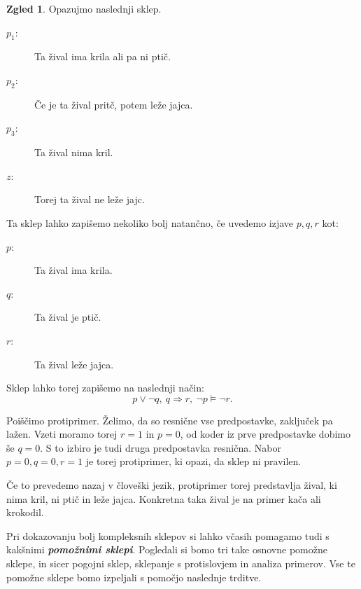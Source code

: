 \documentclass[11pt]{book}
\def\definicija{\color{rdeca}\bf\em}
\theoremstyle{definition}
\theoremstyle{zgled}
\newtheorem*{zgled}{Zgled}
\theoremstyle{odprtproblem}
\theoremstyle{domacanaloga}
\theoremstyle{izrek}
\begin{document}
\begin{zgled}
Opazujmo naslednji sklep.

    \begin{description}
        \item[$p_1$:] Ta žival ima krila ali pa ni ptič.
        \item[$p_2$:] Če je ta žival pritč, potem leže jajca.
        \item[$p_3$:] Ta žival nima kril.
        \item[$z$:] Torej ta žival ne leže jajc.
    \end{description}

Ta sklep lahko zapišemo nekoliko bolj natančno, če uvedemo izjave $p,q,r$ kot:

\begin{description}
    \item[$p$:] Ta žival ima krila.
    \item[$q$:] Ta žival je ptič.
    \item[$r$:] Ta žival leže jajca.
\end{description}

Sklep lahko torej zapišemo na naslednji način:
\[
    p \lor \lnot q, \ q \Rightarrow r, \ \lnot p \models \lnot r.
\]

Poiščimo protiprimer. Želimo, da so resnične vse predpostavke, zaključek pa lažen. Vzeti moramo torej $r = 1$ in $p = 0$, od koder iz prve predpostavke dobimo še $q = 0$. S to izbiro je tudi druga predpostavka resnična. Nabor $p = 0, q = 0, r = 1$ je torej protiprimer, ki opazi, da sklep ni pravilen.

Če to prevedemo nazaj v človeški jezik, protiprimer torej predstavlja žival, ki nima kril, ni ptič in leže jajca. Konkretna taka žival je na primer kača ali krokodil.
\end{zgled}

Pri dokazovanju bolj kompleksnih sklepov si lahko včasih pomagamo tudi s kakšnimi {\definicija pomožnimi sklepi}. Pogledali si bomo tri take osnovne pomožne sklepe, in sicer pogojni sklep, sklepanje s protislovjem in analiza primerov. Vse te pomožne sklepe bomo izpeljali s pomočjo naslednje trditve.
\end{document}
